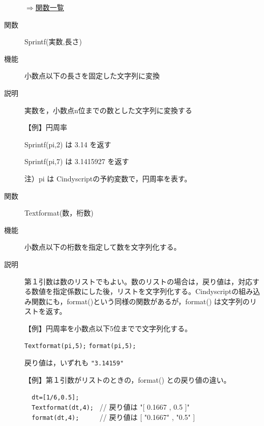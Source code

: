\documentclass[papersize,a4paper,12pt,uplatex]{jsarticle}
\begin{document}
\begin{description}
\begin{flushright}  \hyperlink{functionlist}{$\Rightarrow$関数一覧}\end{flushright}

\vspace{\baselineskip}
\hypertarget{sprintf}{}
\item[関数]  Sprintf(実数,長さ)
\item[機能]  小数点以下の長さを固定した文字列に変換
\item[説明]  実数を，小数点n位までの数とした文字列に変換する

\vspace{\baselineskip}
【例】円周率

 Sprintf(pi,2) は 3.14 を返す

 Sprintf(pi,7) は 3.1415927 を返す
    
注）pi は Cindyscriptの予約変数で，円周率を表す。\vspace{\baselineskip}

\vspace{\baselineskip}
\hypertarget{textformat}{}
\item[関数]  Textformat(数，桁数)
\item[機能]  小数点以下の桁数を指定して数を文字列化する。
\item[説明]  第１引数は数のリストでもよい。数のリストの場合は，戻り値は，対応する数値を指定係数にした後，リストを文字列化する。Cindyscriptの組み込み関数にも，format()という同様の関数があるが，format() は文字列のリストを返す。

\vspace{\baselineskip}
【例】円周率を小数点以下5位までで文字列化する。

\hspace{10mm} \verb|Textformat(pi,5);|
\hspace{10mm} \verb|format(pi,5);|
    
戻り値は，いずれも \verb|"3.14159"|

\vspace{\baselineskip}
【例】第１引数がリストのときの，format() との戻り値の違い。

\hspace{10mm} \verb|  dt=[1/6,0.5];|\\
\hspace{10mm} \verb|  Textformat(dt,4); | // 戻り値は "[ 0.1667 , 0.5 ]" \\
\hspace{10mm} \verb|  format(dt,4);     | // 戻り値は [ "0.1667" , "0.5" ] \\


\end{description}
\end{document}
